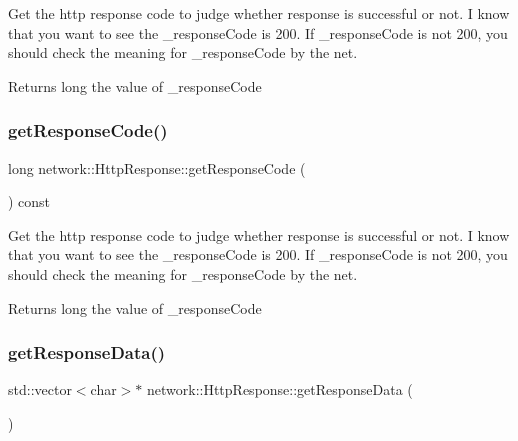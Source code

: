 Get the http response code to judge whether response is successful or not. I know that you want to see the \+\_\+response\+Code is 200. If \+\_\+response\+Code is not 200, you should check the meaning for \+\_\+response\+Code by the net. \begin{DoxyReturn}{Returns}
long the value of \+\_\+response\+Code 
\end{DoxyReturn}
\mbox{\label{classnetwork_1_1HttpResponse_aa968e433339f10f30bee2998e0c237d4}} 
\subsubsection{\texorpdfstring{get\+Response\+Code()}{getResponseCode()}\hspace{0.1cm}{\footnotesize\ttfamily [2/2]}}
{\footnotesize\ttfamily long network\+::\+Http\+Response\+::get\+Response\+Code (\begin{DoxyParamCaption}{ }\end{DoxyParamCaption}) const\hspace{0.3cm}{\ttfamily [inline]}}

Get the http response code to judge whether response is successful or not. I know that you want to see the \+\_\+response\+Code is 200. If \+\_\+response\+Code is not 200, you should check the meaning for \+\_\+response\+Code by the net. \begin{DoxyReturn}{Returns}
long the value of \+\_\+response\+Code 
\end{DoxyReturn}
\mbox{\label{classnetwork_1_1HttpResponse_a476f45e6514da88f0ce5ba462dc2235a}} 
\subsubsection{\texorpdfstring{get\+Response\+Data()}{getResponseData()}\hspace{0.1cm}{\footnotesize\ttfamily [1/2]}}
{\footnotesize\ttfamily std\+::vector$<$char$>$$\ast$ network\+::\+Http\+Response\+::get\+Response\+Data (\begin{DoxyParamCaption}{ }\end{DoxyParamCaption})\hspace{0.3cm}{\ttfamily [inline]}}

